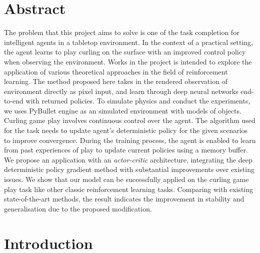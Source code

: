 \documentclass[oneside,11pt,a4paper]{article}
\begin{document}
\clearpage
\maketitle
\vspace{-5.5em}
\begingroup
\fontsize{9pt}{11pt}\selectfont
\tableofcontents
\endgroup
\clearpage
{}





\section{Abstract}

The problem that this project aims to solve is one of the task completion for intelligent agents in a tabletop environment. In the context of a practical setting, the agent learns to play curling on the surface with an improved control policy when observing the environment. Works in the project is intended to explore the application of various theoretical approaches in the field of reinforcement learning. The method proposed here takes in the rendered observation of environment directly as pixel input, and learn through deep neural networks end-to-end with returned policies. To simulate physics and conduct the experiments, we uses PyBullet engine as an simulated environment with models of objects. Curling game play involves continuous control over the agent. The algorithm used for the task needs to update agent's deterministic policy for the given scenarios to improve convergence. During the training process, the agent is enabled to learn from past experiences of play to update current policies using a memory buffer. We propose an application with an \textit{actor-critic} architecture, integrating the deep deterministic policy gradient method with substantial improvements over existing issues. We show that our model can be successfully applied on the curling game play task like other classic reinforcement learning tasks. Comparing with existing state-of-the-art methods, the result indicates the improvement in stability and generalisation due to the proposed modification.
\vspace{0.5cm}

\section{Introduction}
\end{document}
